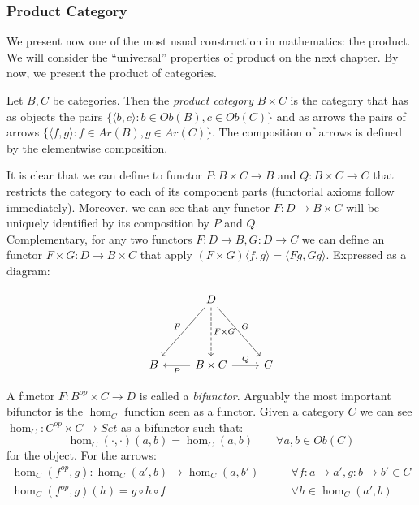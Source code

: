 \subsubsection{Product Category}
We present now one of the most usual construction in mathematics: the product. We will consider the ``universal'' properties of product on the next chapter. By now, we present the product of categories.

\begin{definition}
  Let $B,C$ be categories. Then the \emph{product category} $B\times C$ is the category that has as objects the pairs $\{\langle b,c\rangle : b \in Ob(B), c\in Ob(C)\}$ and as arrows the pairs of arrows $\{\langle f,g\rangle: f \in Ar(B), g\in Ar(C)\}$. The composition of arrows is defined by the elementwise composition. 
\end{definition}

It is clear that we can define to functor $P: B\times C \to B$ and $Q: B \times C \to C$ that restricts the category to each of its component parts (functorial axioms follow immediately). Moreover, we can see that any functor $F:D\to B\times C$ will be uniquely identified by its composition by $P$ and $Q$.\\

Complementary, for any two functors $F:D\to B, G:D\to C$ we can define an functor $F \times G : D \to B\times C$ that apply $(F\times G) \langle f,g\rangle = \langle Fg, Gg\rangle$. Expressed as a diagram: 

\[
\begin{tikzcd}
  {} & D
  \arrow[swap, "F"]{ddl}
  \arrow[dashed, "F\times G"]{dd}
  \arrow["G"]{ddr}\\
  {} & \\
  B & B \times C
  \arrow["P"]{l}
  \arrow["Q"]{r} & C
\end{tikzcd}
\]

A functor $F: B^{op}\times C \to D$ is called  a \emph{bifunctor}. Arguably the most important bifunctor is the $\hom_C$ function seen as a functor. Given a category $C$ we can see $\hom_C: C^{op}\times C \to Set$ as a bifunctor such that:
\[
  \hom_C(\cdot,\cdot)(a,b) = \hom_C (a,b) \qquad \forall a,b \in Ob(C)
\]
for the object. For the arrows:
\begin{align*}
  \hom_C(f^{op},g): \hom_C (a',b)  \to \hom_C(a,b') &\qquad  \forall f:a\to a', g:b\to b' \in C\\
  \hom_C(f^{op},g) (h)   = g \circ h \circ f  &\qquad \forall  h\in \hom_C(a',b) 
\end{align*}

